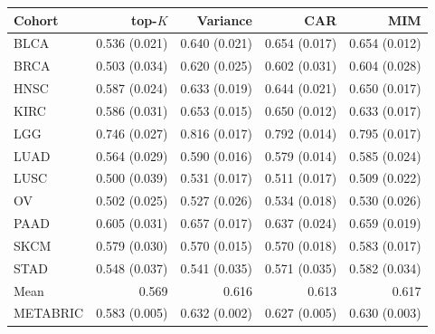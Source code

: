 \begin{tabular}{@{}l rrrr@{}}
\toprule
Cohort & top-$K$ & Variance & CAR & MIM \\
\midrule
BLCA & 0.536 (0.021) & 0.640 (0.021) & 0.654 (0.017) & 0.654 (0.012) \\
BRCA & 0.503 (0.034) & 0.620 (0.025) & 0.602 (0.031) & 0.604 (0.028) \\
HNSC & 0.587 (0.024) & 0.633 (0.019) & 0.644 (0.021) & 0.650 (0.017) \\
KIRC & 0.586 (0.031) & 0.653 (0.015) & 0.650 (0.012) & 0.633 (0.017) \\
LGG & 0.746 (0.027) & 0.816 (0.017) & 0.792 (0.014) & 0.795 (0.017) \\
LUAD & 0.564 (0.029) & 0.590 (0.016) & 0.579 (0.014) & 0.585 (0.024) \\
LUSC & 0.500 (0.039) & 0.531 (0.017) & 0.511 (0.017) & 0.509 (0.022) \\
OV & 0.502 (0.025) & 0.527 (0.026) & 0.534 (0.018) & 0.530 (0.026) \\
PAAD & 0.605 (0.031) & 0.657 (0.017) & 0.637 (0.024) & 0.659 (0.019) \\
SKCM & 0.579 (0.030) & 0.570 (0.015) & 0.570 (0.018) & 0.583 (0.017) \\
STAD & 0.548 (0.037) & 0.541 (0.035) & 0.571 (0.035) & 0.582 (0.034) \\
\midrule
Mean & 0.569 & 0.616 & 0.613 & 0.617 \\
\midrule
METABRIC & 0.583 (0.005) & 0.632 (0.002) & 0.627 (0.005) & 0.630 (0.003) \\
\bottomrule
\end{tabular}
